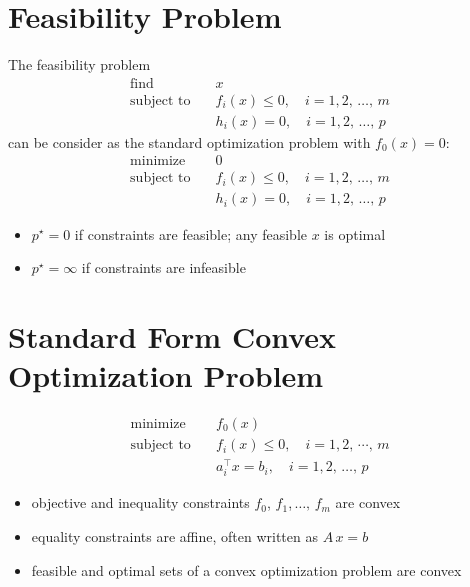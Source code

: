 \documentclass[11pt]{extarticle}
\newcommand{\ds}{\displaystyle}
\theoremstyle{definition}
\begin{document}
\newpage

\section*{Feasibility Problem}
The feasibility problem
\begin{align*}
  \text{find}\quad &x \\
  \text{subject to}\quad &f_i(x)\leqslant 0, \quad i = 1, 2,\,\ldots,\,m \\
  \qquad\qquad &h_i(x) = 0, \quad i = 1, 2,\,\ldots,\,p
\end{align*}
can be consider as the standard optimization problem with $f_0(x) = 0$:
\begin{align*}
  \text{minimize}\quad &0 \\
  \text{subject to}\quad &f_i(x)\leqslant 0, \quad i = 1, 2,\,\ldots,\,m \\
  \qquad\qquad &h_i(x) = 0, \quad i = 1, 2,\,\ldots,\,p
\end{align*}
\begin{itemize}
  \item $p^\star = 0$ if constraints are feasible; any feasible $x$ is optimal
  \item $p^\star = \infty$ if constraints are infeasible
\end{itemize}

\newpage

\section*{Standard Form Convex Optimization Problem}
\begin{align*}
  \text{minimize}\quad &f_0(x) \\
  \text{subject to}\quad &f_i(x)\leqslant 0, \quad i = 1, 2,\,\cdots,\,m \\
  \qquad\qquad &a_i^\top x = b_i, \quad i = 1, 2,\,\ldots,\,p
\end{align*}

\vspace{1mm}
\begin{itemize}
  \item objective and inequality constraints $f_0$, $f_1$,$\,\ldots,\,$$f_m$ are convex
  \item equality constraints are affine, often written as $\ds A\,x = b$
  \item feasible and optimal sets of a convex optimization problem are convex
\end{itemize}
\end{document}
